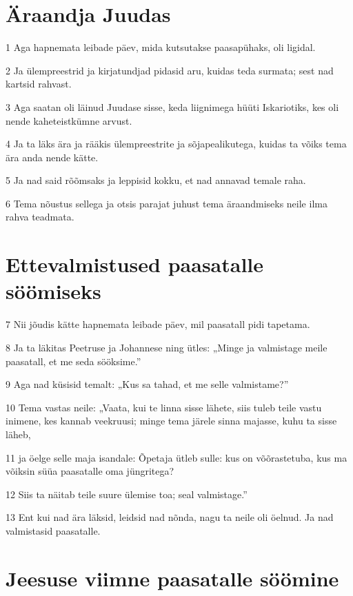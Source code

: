 \section*{Äraandja Juudas}

\par 1 Aga hapnemata leibade päev, mida kutsutakse paasapühaks, oli ligidal.
\par 2 Ja ülempreestrid ja kirjatundjad pidasid aru, kuidas teda surmata; sest nad kartsid rahvast.
\par 3 Aga saatan oli läinud Juudase sisse, keda liignimega hüüti Iskariotiks, kes oli nende kaheteistkümne arvust.
\par 4 Ja ta läks ära ja rääkis ülempreestrite ja sõjapealikutega, kuidas ta võiks tema ära anda nende kätte.
\par 5 Ja nad said rõõmsaks ja leppisid kokku, et nad annavad temale raha.
\par 6 Tema nõustus sellega ja otsis parajat juhust tema äraandmiseks neile ilma rahva teadmata.

\section*{Ettevalmistused paasatalle söömiseks}

\par 7 Nii jõudis kätte hapnemata leibade päev, mil paasatall pidi tapetama.
\par 8 Ja ta läkitas Peetruse ja Johannese ning ütles: „Minge ja valmistage meile paasatall, et me seda sööksime.”
\par 9 Aga nad küsisid temalt: „Kus sa tahad, et me selle valmistame?”
\par 10 Tema vastas neile: „Vaata, kui te linna sisse lähete, siis tuleb teile vastu inimene, kes kannab veekruusi; minge tema järele sinna majasse, kuhu ta sisse läheb,
\par 11 ja öelge selle maja isandale: Õpetaja ütleb sulle: kus on võõrastetuba, kus ma võiksin süüa paasatalle oma jüngritega?
\par 12 Siis ta näitab teile suure ülemise toa; seal valmistage.”
\par 13 Ent kui nad ära läksid, leidsid nad nõnda, nagu ta neile oli öelnud. Ja nad valmistasid paasatalle.

\section*{Jeesuse viimne paasatalle söömine}

